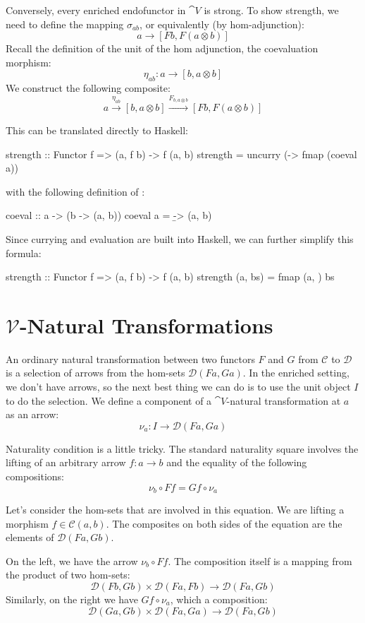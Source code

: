 \documentclass[DaoFP]{subfiles}
\begin{document}
Conversely, every enriched endofunctor in $\cat V$ is strong. To show strength, we need to define the mapping $\sigma_{a b}$, or equivalently (by hom-adjunction):
\[ a \to [F b, F (a \otimes b)] \]
Recall the definition of the unit of the hom adjunction, the coevaluation morphism:
\[ \eta_{a b} \colon a \to [b, a \otimes b] \]
We construct the following composite:
\[ a \xrightarrow{\eta_{a b}} [b, a \otimes b] \xrightarrow{F_{b, a \otimes b}} [F b, F (a \otimes b)] \]

This can be translated directly to Haskell:
\begin{haskell}
strength :: Functor f => (a, f b) -> f (a, b)
strength = uncurry (\a -> fmap (coeval a))
\end{haskell}
with the following definition of :
\begin{haskell}
coeval :: a -> (b -> (a, b))
coeval a = \b -> (a, b)
\end{haskell}
Since currying and evaluation are built into Haskell, we can further simplify this formula:
\begin{haskell}
strength :: Functor f => (a, f b) -> f (a, b)
strength (a, bs) = fmap (a, ) bs
\end{haskell}

\section{$\mathcal V$-Natural Transformations}

An ordinary natural transformation between two functors $F$ and $G$ from $\mathcal C$ to $\mathcal D$ is a selection of arrows from the hom-sets $\mathcal D(F a, G a)$. In the enriched setting, we don't have arrows, so the next best thing we can do is to use the unit object $I$ to do the selection. We define a component of a $\cat V$-natural transformation at $a$ as an arrow:
\[ \nu_a \colon I \to \mathcal D(F a, G a) \]

Naturality condition is a little tricky. The standard naturality square involves the lifting of an arbitrary arrow $f \colon a \to b$ and the equality of the following compositions:
\[ \nu_b \circ F f = G f \circ \nu_a \]

Let's consider the hom-sets that are involved in this equation. We are lifting a morphism $f \in \mathcal C(a, b)$. The composites on both sides of the equation are the elements of $\mathcal D(F a, G b)$. 

On the left, we have the arrow $ \nu_b \circ F f$. The composition itself is a mapping from the product of two hom-sets:
\[  \mathcal D(F b, G b) \times \mathcal D(F a, F b) \to \mathcal D(F a, G b) \]
Similarly, on the right we have $G f \circ \nu_a$, which a composition:
\[ \mathcal D(G a, G b) \times \mathcal D(F a, G a) \to  \mathcal D(F a, G b) \]
\end{document}
